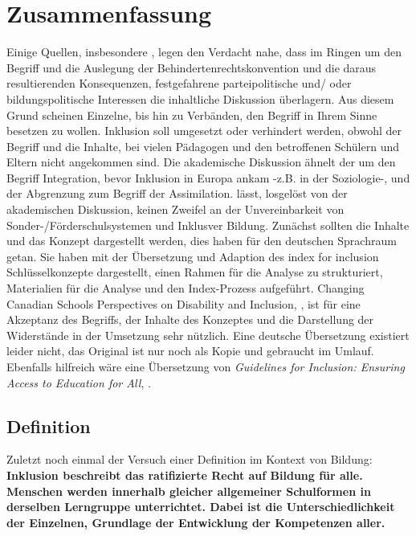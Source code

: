 \section{Zusammenfassung}
Einige Quellen, insbesondere \cite{Fes:10}, legen den Verdacht nahe, dass im Ringen um den Begriff und die Auslegung der Behinderten­rechtskonvention und die daraus resultierenden Konsequenzen, festgefahrene parteipolitische und/ oder bildungspolitische Interessen die in­haltliche Diskussion überlagern. Aus diesem Grund scheinen Einzelne, bis hin zu Verbänden, den Begriff in Ihrem Sinne besetzen zu wollen.
Inklusion soll umgesetzt oder verhindert werden, obwohl der Be­griff und die Inhalte, bei vielen Pädagogen und den betroffenen Schülern und Eltern nicht an­ge­kommen sind. Die akademische Diskussion ähnelt der um den Begriff Integration, bevor Inklusion in Europa ankam -z.B. in der Soziologie-, und der Abgrenzung zum Begriff der Assimilation. \citeauthor{UN:11} lässt, losgelöst von der akademischen Diskussion, keinen Zweifel an der Unvereinbarkeit von Sonder-/Förderschulsystemen und Inklusver Bildung. 
Zunächst sollten die Inhalte und das Konzept dargestellt werden, dies haben \citeauthor*{BoHi:03} für den deutschen Sprachraum getan. Sie haben mit der Übersetzung und Adaption des index for inclusion Schlüsselkonzepte dargestellt, einen Rahmen für die Analyse zu strukturiert, Mater­ial­ien für die Analyse und den Index-Prozess auf­geführt.
Changing Canadian Schools Perspectives on Disability and Inclusion, \citeauthor{PoRi:90},  ist für eine Akzeptanz des Begriffs, der Inhalte des Konzeptes und die Darstellung der Widerstände in der Um­setzung sehr nützlich. Eine deutsche Übersetzung existiert leider nicht, das Original ist nur noch als Kopie und ge­braucht im Um­lauf.
Ebenfalls hilfreich wäre eine Übersetzung von \textit{Guidelines for Inclusion: Ensuring Access to Education for All}, \citeyear{UNESCO:05}.

\subsection{Definition}
Zuletzt noch einmal der Versuch einer Definition im Kontext von Bildung:
\textbf{Inklusion beschreibt das ratifizierte Recht auf Bildung für alle. Menschen werden inner­halb gleicher allgemeiner Schulformen in derselben Lerngruppe unterrichtet. Dabei ist die Unterschiedlichkeit der Einzelnen, Grund­lage der Entwicklung der Kompetenzen aller.}





